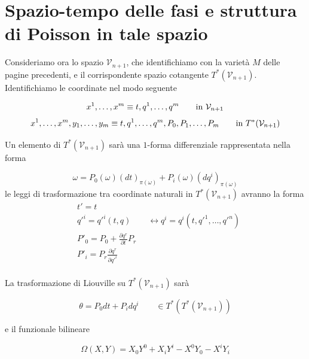 \section{Spazio-tempo delle fasi e struttura di Poisson in tale spazio}
\setcounter{equation}{0}

Consideriamo ora lo spazio $ \mathcal{V}_{n+1} $, che identifichiamo con la varietà $ M $ delle pagine precedenti, e il corrispondente spazio cotangente $ T^* (\mathcal{V}_{n+1}) $. \\
Identifichiamo le coordinate nel modo seguente

\begin{center}
$$ x^1, \dots , x^m \equiv t, q^1, \dots , q^m \qquad \text{in $ \mathcal{V}_{n+1} $} $$
$$ x^1, \dots , x^m , y_1, \dots , y_m \equiv t, q^1, \dots , q^m, P_0, P_1, \dots , P_m \qquad \text{in $ T^* (\mathcal{V}_{n+1}) $} $$
\end{center}

Un elemento di $T^* (\mathcal{V}_{n+1})$ sarà una $ 1 $-forma differenziale rappresentata nella forma

\begin{equation*}
\omega = P_0 (\omega) (dt)_{\pi (\omega)} + P_i (\omega) (dq^i)_{\pi (\omega)}
\end{equation*}
le leggi di trasformazione tra coordinate naturali in $T^* (\mathcal{V}_{n+1})$ avranno la forma
\begin{equation*}
\begin{split}
& t' = t \\
& q'^i = q'^i (t, q) \qquad \leftrightarrow q^i = q^i (t, q'^1, \dots , q'^n) \\
& P'_0 = P_0 + \frac{\partial q^r}{\partial t} P_r \\
& P'_i = P_r \frac{\partial q^r}{\partial q'^i} \\
\end{split}
\end{equation*}

La trasformazione di Liouville su $T^* (\mathcal{V}_{n+1})$ sarà

\begin{equation*}
\theta = P_0 dt + P_i dq^i \qquad \in T^* (T^* (\mathcal{V}_{n+1}))
\end{equation*}

e il funzionale bilineare

\begin{equation*}
\Omega(X, Y) = X_0 Y^0 + X_i Y^i - X^0 Y_0 - X^i Y_i
\end{equation*}

